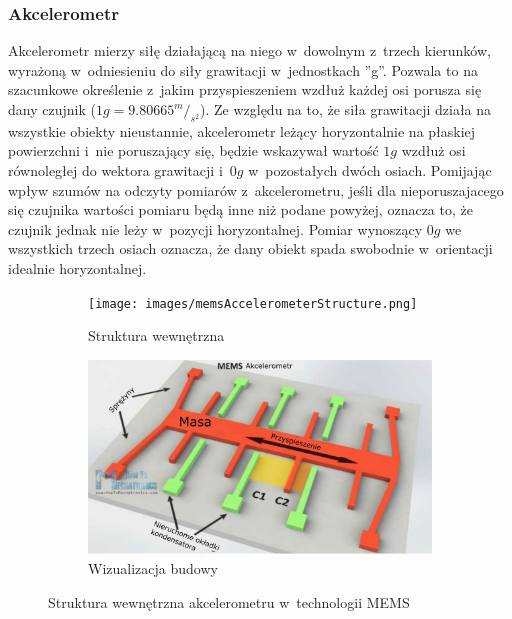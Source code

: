 																																											
\subsubsection*{Akcelerometr}
Akcelerometr mierzy siłę działającą na niego w~dowolnym z~trzech kierunków, wyrażoną w~odniesieniu do siły grawitacji w~jednostkach ''g''. Pozwala to na szacunkowe określenie z~jakim przyspieszeniem wzdłuż każdej osi porusza się dany czujnik 
($1g =9.80665^m/_{s^2}$). Ze względu na to, że siła grawitacji działa na wszystkie obiekty nieustannie, akcelerometr leżący horyzontalnie na płaskiej powierzchni i~nie poruszający się, będzie wskazywał wartość $1g$ wzdłuż osi równoległej do wektora grawitacji i~$0g$ w~pozostałych dwóch osiach. Pomijając wpływ szumów na odczyty pomiarów z~akcelerometru, jeśli dla nieporuszajacego się czujnika wartości pomiaru będą inne niż podane powyżej, oznacza to, że czujnik jednak nie leży w~pozycji horyzontalnej. Pomiar wynoszący $0g$ we wszystkich trzech osiach oznacza, że dany obiekt spada swobodnie w~orientacji idealnie horyzontalnej.\\
																																													
\begin{savenotes}
	\begin{figure}[!htb]
		\captionsetup{singlelinecheck=off}
		\centering
		\begin{subfigure}[b]{0.45\textwidth}
			\centering
			\texttt{[image: images/memsAccelerometerStructure.png]}	
			\caption[Struktura wewnętrzna akcelerometru]{Struktura wewnętrzna }
			\label{fig:characteristics:imu:acc:memsA}
		\end{subfigure}
																																																		
		\begin{subfigure}[b]{0.45\textwidth}
			\centering
			\includegraphics[width=\linewidth]{images/memsAccelerometerIdea.png}		
			\caption[Wizualizacja budowy akcelerometru]{Wizualizacja budowy }
			\label{fig:characteristics:imu:acc:memsB}
		\end{subfigure}				
		\caption{Struktura wewnętrzna akcelerometru w~technologii MEMS}
		\label{fig:characteristics:imu:acc:mems}
	\end{figure}
\end{savenotes}
																																											
